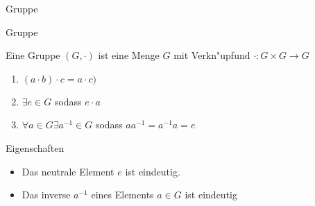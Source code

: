 \documentclass[class=article, crop=false]{standalone}
\begin{document}
\begin{zettel}{Gruppe}
\begin{flashcard}{Gruppe}
	\begin{definition}[Gruppe]
		Eine Gruppe $(G, \cdot )$ ist eine Menge $G$ mit Verkn"upfund $\cdot : G \times G \longrightarrow G$
		\begin{enumerate}
			\item $(a \cdot b) \cdot c =  a \cdot c) $
			\item $\exists e \in  G$  sodass $e \cdot  a $
			\item $\forall a \in  G \exists a^{-1} \in  G$  sodass $aa^{-1} =  a^{-1} a = e$
		\end{enumerate}

	\end{definition}
\end{flashcard}
\begin{remark}
	Eigenschaften
	\begin{itemize}
		\item Das neutrale Element $e$ ist eindeutig.
		\item Das inverse $a^{-1} $ eines Elements $a \in  G$ ist eindeutig
	\end{itemize}
\end{remark}
\end{zettel}
\end{document}
